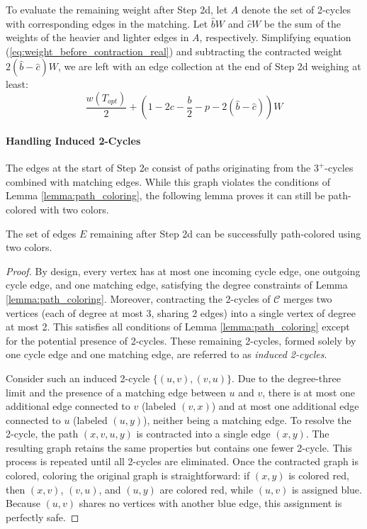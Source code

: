 To evaluate the remaining weight after Step 2d, let $A$ denote the set of
2-cycles with corresponding edges in the matching. Let $\hat{b}W$ and $\hat{c}W$
be the sum of the weights of the heavier and lighter edges in $A$, respectively.
Simplifying equation (\ref{eq:weight_before_contraction_real}) and subtracting
the contracted weight $2(\hat{b} - \hat{c})W$, we are left with an edge
collection at the end of Step 2d weighing at least:
\begin{equation} \label{eq:weight_after_contraction_real}
\frac{w(T_{opt})}{2} + \left(1 - 2c - \frac{b}{2} - p - 2(\hat{b} - \hat{c})\right)W
\end{equation}

\paragraph{Handling Induced 2-Cycles}
The edges at the start of Step 2e consist of paths originating from the
$3^+$-cycles combined with matching edges. While this graph violates the
conditions of Lemma \ref{lemma:path_coloring}, the following lemma proves it can
still be path-colored with two colors.

\begin{lemma} \label{lemma:induced_cycles}
The set of edges $E$ remaining after Step 2d can be successfully path-colored
using two colors.
\end{lemma}

\begin{proof}
By design, every vertex has at most one incoming cycle edge, one outgoing cycle
edge, and one matching edge, satisfying the degree constraints of Lemma
\ref{lemma:path_coloring}. Moreover, contracting the 2-cycles of $\mathcal{C}$
merges two vertices (each of degree at most 3, sharing 2 edges) into a single
vertex of degree at most 2. This satisfies all conditions of Lemma
\ref{lemma:path_coloring} except for the potential presence of 2-cycles. These
remaining 2-cycles, formed solely by one cycle edge and one matching edge, are
referred to as \textit{induced 2-cycles}.

Consider such an induced 2-cycle $\{(u, v), (v, u)\}$. Due to the degree-three
limit and the presence of a matching edge between $u$ and $v$, there is at most
one additional edge connected to $v$ (labeled $(v, x)$) and at most one
additional edge connected to $u$ (labeled $(u, y)$), neither being a matching
edge. To resolve the 2-cycle, the path $(x, v, u, y)$ is contracted into a
single edge $(x, y)$. The resulting graph retains the same properties but
contains one fewer 2-cycle. This process is repeated until all 2-cycles are
eliminated. Once the contracted graph is colored, coloring the original graph is
straightforward: if $(x, y)$ is colored red, then $(x, v)$, $(v, u)$, and $(u,
y)$ are colored red, while $(u, v)$ is assigned blue. Because $(u, v)$ shares no
vertices with another blue edge, this assignment is perfectly safe.
\end{proof}

